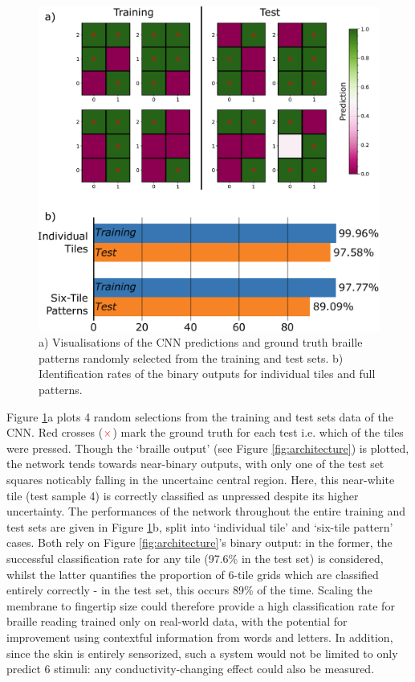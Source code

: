 \begin{figure}[htbp]
  \centering
  \includegraphics[width=\columnwidth]{Images/6pointdata.pdf}
  \caption{a) Visualisations of the CNN predictions and ground truth braille patterns randomly selected from the training and test sets. b) Identification rates of the binary outputs for individual tiles and full patterns.}
  \label{fig:6point}
\end{figure}

Figure \ref{fig:6point}a plots 4 random selections from the training and test sets data of the CNN. Red crosses (${\textcolor{red}{\times}}$) mark the ground truth for each test i.e. which of the tiles were pressed. Though the `braille output' (see Figure \ref{fig:architecture}) is plotted, the network tends towards near-binary outputs, with only one of the test set squares noticably falling in the uncertainc central region. Here, this near-white tile (test sample 4) is correctly classified as unpressed despite its higher uncertainty. The performances of the network throughout the entire training and test sets are given in Figure \ref{fig:6point}b, split into `individual tile' and `six-tile pattern' cases. Both rely on Figure \ref{fig:architecture}'s binary output: in the former, the successful classification rate for any tile (97.6\% in the test set) is considered, whilst the latter quantifies the proportion of 6-tile grids which are classified entirely correctly - in the test set, this occurs 89\% of the time. Scaling the membrane to fingertip size could therefore provide a high classification rate for braille reading trained only on real-world data, with the potential for improvement using contextful information from words and letters. In addition, since the skin is entirely sensorized, such a system would not be limited to only predict 6 stimuli: any conductivity-changing effect could also be measured.

